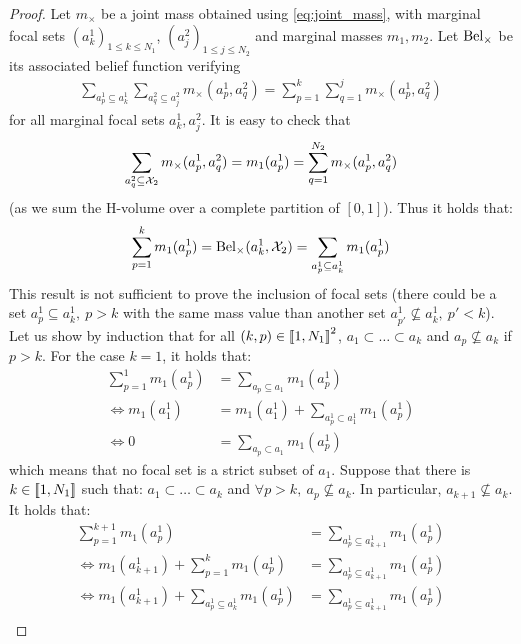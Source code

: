 \begin{proof}
    Let $m_\times$ be a joint mass obtained using \eqref{eq:joint_mass}, with marginal focal sets $(a^1_k)_{1\leqslant k\leqslant N_1}$, $(a^2_j)_{1\leqslant j\leqslant N_2}$ and marginal masses $m_1,m_2$. 
    Let ${\mathrm{Bel}}_\times$ be its associated belief function verifying
    \begin{align*}
        \sum_{a^1_p\subseteq a^1_k}\sum_{a^2_q\subseteq a_j^2}m_\times(a^1_p, a^2_q) = \sum_{p=1}^k\sum_{q=1}^j m_\times(a^1_p, a^2_q)
    \end{align*}
    for all marginal focal sets $a^1_k,a^2_j$. It is easy to check that
    \begin{align*}
        \sum_{a^2_q\subseteq {\mathcal{X}}_2}m_\times(a^1_p, a^2_q)=m_1(a^1_p)=\sum_{q=1}^{N_2}m_\times(a^1_p, a^2_q)    
    \end{align*}
    (as we sum the H-volume over a complete partition of $[0,1]$). Thus it holds that:
    \begin{align*}
        \sum_{p=1}^k m_1(a^1_p) = {\mathrm{Bel}}_\times(a^1_k,{\mathcal{X}}_2)=\sum_{a^1_p\subseteq a_k^1}m_1(a^1_p)
    \end{align*}
    This result is not sufficient to prove the inclusion of focal sets (there could be a set $a^1_p\subseteq a^1_k,~p>k$ with the same mass value than another set $a^1_{p'}\not\subseteq a^1_k,~p' < k$). Let us show by induction that for all $(k, p)\in{[\![}1,N_1{]\!]}^2$, $a_1\subset\dots\subset a_k$ and $a_p\not\subseteq a_k$ if $p>k$.
    For the case $k=1$, it holds that:
    \begin{align*}
        \sum_{p=1}^1m_1(a^1_p) &= \sum_{a_p\subseteq a_1}m_1(a^1_p)\\
        \Leftrightarrow m_1(a^1_1) &= m_1(a^1_1) + \sum_{a^1_p\subset a^1_1}m_1(a^1_p)\\
        \Leftrightarrow 0 &=\sum_{a_p\subset a_1}m_1(a^1_p)
    \end{align*}
    which means that no focal set is a strict subset of $a_1$.
    Suppose that there is $k\in{[\![}1,N_1{]\!]}$ such that: $a_1\subset\dots\subset a_k$ and $\forall p>k,~a_p\not\subseteq a_k$. In particular, $a_{k+1}\not\subseteq a_k$. It holds that:
    \begin{align*}
        \sum_{p=1}^{k+1}m_1(a^1_p) &= \sum_{a^1_p\subseteq a^1_{k+1}}m_1(a^1_p)\\
        \Leftrightarrow m_1(a^1_{k+1}) + \sum_{p=1}^{k} m_1(a^1_p) &= \sum_{a^1_p\subseteq a^1_{k+1}}m_1(a^1_p)\\
        \Leftrightarrow m_1(a^1_{k+1}) + \sum_{a^1_p\subseteq a^1_k} m_1(a^1_p) &= \sum_{a^1_p\subseteq a^1_{k+1}}m_1(a^1_p)\\

\end{align*}
\end{proof}
